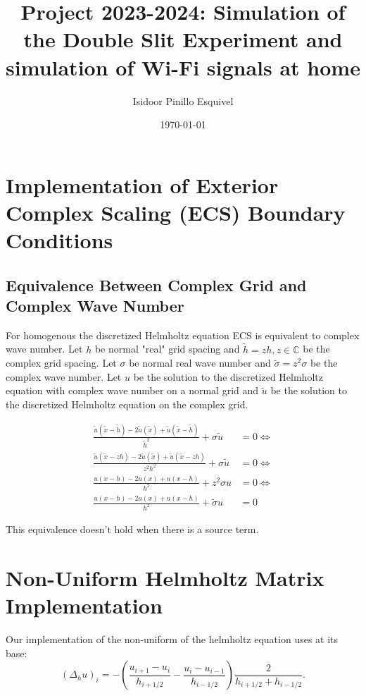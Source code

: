 \documentclass[a4paper,12pt]{article}
\begin{document}
\title{Project 2023-2024: Simulation of the Double Slit Experiment
    and simulation of Wi-Fi signals at home}
\author{Isidoor Pinillo Esquivel}
\date{\today}
\maketitle


\section{Implementation of Exterior Complex Scaling (ECS) Boundary Conditions}
\subsection{Equivalence Between Complex Grid and Complex Wave Number}

For homogenous the discretized Helmholtz equation ECS is equivalent to
complex wave number. Let $h$ be normal "real" grid spacing and $\tilde{h} = z h, z \in \mathbb{C} $
be the complex grid spacing.
Let $\sigma$ be normal real wave number and $\tilde{\sigma} = z^{2} \sigma$ be the complex wave number.
Let $u$ be the solution to the discretized Helmholtz equation with complex wave number on a normal grid
and $\tilde{u}$ be the solution to the discretized Helmholtz equation on the complex grid.

\begin{align}
    \frac{\tilde{u}(\tilde{x}-\tilde{h}) -2 \tilde{u}(\tilde{x}) + \tilde{u}(\tilde{x} - \tilde{h})}{\tilde{h}^2} + \sigma \tilde{u} & = 0  \Leftrightarrow \\
    \frac{\tilde{u}(\tilde{x}-zh) -2 \tilde{u}(\tilde{x}) + \tilde{u}(\tilde{x} - zh)}{z^{2}h^2} + \sigma \tilde{u}                  & = 0  \Leftrightarrow \\
    \frac{u(x-h) -2 u(x) + u(x - h)}{h^2} + z^{2} \sigma u                                                                           & = 0  \Leftrightarrow \\
    \frac{u(x-h) -2 u(x) + u(x - h)}{h^2} + \tilde{\sigma} u                                                                         & = 0
\end{align}

This equivalence doesn't hold when there is a source term.

\section{Non-Uniform Helmholtz Matrix Implementation}
Our implementation of the non-uniform of the helmholtz equation uses at its base:
$$
    (\Delta_{h}u)_{i} = -\left( \frac{u_{i+1} - u_{i}}{h_{i+1/2}} - \frac{u_{i} - u_{i-1}}{h_{i-1/2}} \right) \frac{2}{h_{i+1/2} +h_{i-1/2}}
    .
$$
\end{document}
